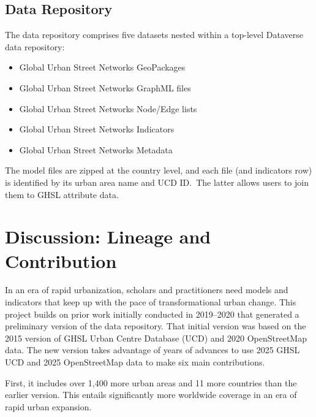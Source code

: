 \documentclass[12pt,letterpaper]{article} %
\begin{document}
\subsection{Data Repository}

The data repository comprises five datasets nested within a top-level Dataverse data repository:

\begin{itemize}
    \item Global Urban Street Networks GeoPackages
    \item Global Urban Street Networks GraphML files
    \item Global Urban Street Networks Node/Edge lists
    \item Global Urban Street Networks Indicators 
    \item Global Urban Street Networks Metadata 
\end{itemize}

The model files are zipped at the country level, and each file (and indicators row) is identified by its urban area name and UCD ID.\ The latter allows users to join them to GHSL attribute data.

\section{Discussion: Lineage and Contribution}

In an era of rapid urbanization, scholars and practitioners need models and indicators that keep up with the pace of transformational urban change. This project builds on prior work initially conducted in 2019--2020 that generated a preliminary version of the data repository. That initial version was based on the 2015 version of GHSL Urban Centre Database (UCD) and 2020 OpenStreetMap data. The new version takes advantage of years of advances to use 2025 GHSL UCD and 2025 OpenStreetMap data to make six main contributions.

First, it includes over 1,400 more urban areas and 11 more countries than the earlier version. This entails significantly more worldwide coverage in an era of rapid urban expansion.
\end{document}
